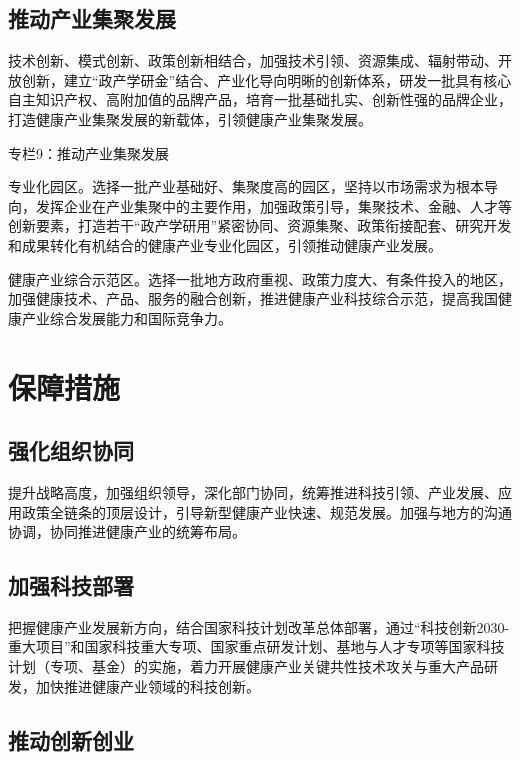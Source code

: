 \documentclass{article}
\begin{document}
\subsection{推动产业集聚发展}

技术创新、模式创新、政策创新相结合，加强技术引领、资源集成、辐射带动、开放创新，建立“政产学研金”结合、产业化导向明晰的创新体系，研发一批具有核心自主知识产权、高附加值的品牌产品，培育一批基础扎实、创新性强的品牌企业，打造健康产业集聚发展的新载体，引领健康产业集聚发展。

\begin{minipage}{20em}
专栏9：推动产业集聚发展

专业化园区。选择一批产业基础好、集聚度高的园区，坚持以市场需求为根本导向，发挥企业在产业集聚中的主要作用，加强政策引导，集聚技术、金融、人才等创新要素，打造若干“政产学研用”紧密协同、资源集聚、政策衔接配套、研究开发和成果转化有机结合的健康产业专业化园区，引领推动健康产业发展。

健康产业综合示范区。选择一批地方政府重视、政策力度大、有条件投入的地区，加强健康技术、产品、服务的融合创新，推进健康产业科技综合示范，提高我国健康产业综合发展能力和国际竞争力。
\end{minipage}

\section{保障措施}
\subsection{强化组织协同}

提升战略高度，加强组织领导，深化部门协同，统筹推进科技引领、产业发展、应用政策全链条的顶层设计，引导新型健康产业快速、规范发展。加强与地方的沟通协调，协同推进健康产业的统筹布局。

\subsection{加强科技部署}

把握健康产业发展新方向，结合国家科技计划改革总体部署，通过“科技创新2030-重大项目”和国家科技重大专项、国家重点研发计划、基地与人才专项等国家科技计划（专项、基金）的实施，着力开展健康产业关键共性技术攻关与重大产品研发，加快推进健康产业领域的科技创新。

\subsection{推动创新创业}
\end{document}
